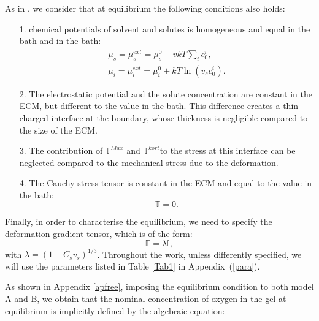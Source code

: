 \documentclass[runningheads]{llncs}
\newcommand{\F}{\ensuremath{\mathbb{F}}}
\begin{document}
As in \cite{DROZDOVph}, we consider that at equilibrium the following conditions also holds:
\begin{itemize}
	\item[1.] chemical potentials of solvent and solutes is homogeneous and equal in the bath and in the bath:
	\begin{eqnarray}
	\mu_s=\mu^{ext}_s = \mu^0_s - vkT \sum_i c^i_0 ,\\\label{free1}
	\mu_i=\mu^{ext}_i = \mu^0_i +kT\ln(v_sc^i_0).
	\end{eqnarray} 
	\item[2.] The electrostatic potential and the solute concentration are constant in the ECM, but different to the value in the bath. This difference creates a thin charged interface at the boundary, whose thickness is negligible compared to the size of the ECM.
	\item[3.] The contribution of $\mathbb{T}^{Max}$ and $\mathbb{T}^{kort}$to the stress at this interface can be neglected compared to the mechanical stress due to the deformation. 
	\item[4.] The Cauchy stress tensor is constant in the ECM and equal to the value in the bath:
	\begin{equation}
	\mathbb{T}=0.\label{free2}
	\end{equation} 
\end{itemize}

Finally, in order to characterise the equilibrium, we need to specify the deformation gradient tensor, which is of the form:
\begin{equation}
\F= \lambda \mathbb{I},\label{deffree}                                                                
\end{equation}
with $\lambda=(1+C_s v_s)^{1/3}$. 
Throughout the work, unless differently specified, we will use the parameters listed in Table \ref{Tab1} in Appendix~(\ref{para}).

As shown in Appendix \ref{apfree}, imposing the equilibrium condition to both model A and B, we obtain that the nominal concentration of oxygen in the gel at equilibrium is implicitly defined by the algebraic equation:
\end{document}
